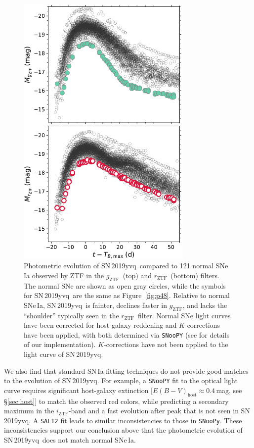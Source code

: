 \documentclass[twocolumn]{aastex63}
\newcommand{\rztf}{$r_\mathrm{ZTF}$}
\newcommand{\gztf}{$g_\mathrm{ZTF}$}
\newcommand{\iztf}{$i_\mathrm{ZTF}$}
\newcommand{\sn}{SN\,2019yvq}
\begin{document}
\begin{figure}
    \centering
    \includegraphics[width=3.35in]{./figures/abs_mag_host_ebv_kcorr.pdf}
    \caption{Photometric evolution of \sn\ compared to 121 normal SNe\,Ia
    observed by ZTF \citep{Yao19} in the \gztf\ (top) and \rztf\ (bottom)
    filters. The normal SNe are shown as open gray circles, while the symbols
    for \sn\ are the same as Figure~\ref{fig:p48}. Relative to normal SNe\,Ia,
    \sn\ is fainter, declines faster in \gztf, and lacks the ``shoulder''
    typically seen in the \rztf\ filter. Normal SNe light curves have been
    corrected for host-galaxy reddening and $K$-corrections have been applied,
    with both determined via \texttt{SNooPY} (see \citealt{Bulla20} for
    details of our implementation). $K$-corrections have not been applied to
    the light curve of \sn.}
    \label{fig:lc_comp}
\end{figure}

We also find that standard SN\,Ia fitting techniques do not provide good
matches to the evolution of \sn. For example, a \texttt{SNooPY}
\citep{Burns11} fit to the optical light curve requires significant
host-galaxy extinction [$E(B-V)_\mathrm{host}\approx0.4$\,mag, see
\S\ref{sec:host}] to match the observed red colors, while predicting a
secondary maximum in the \iztf-band and a fast evolution after peak that is
not seen in \sn. A \texttt{SALT2} \citep{Guy07} fit leads to similar
inconsistencies to those in \texttt{SNooPy}. These inconsistencies support our
conclusion above that the photometric evolution of \sn\ does not match normal
SNe\,Ia.
\end{document}
